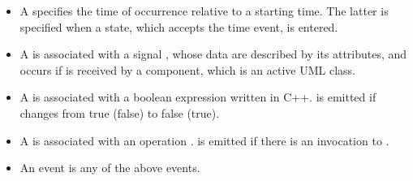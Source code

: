 	\begin{itemize}[\footnotesize]
		\item A  specifies the time of occurrence  relative to a starting time. 
		The latter is specified when a state, which accepts the time event, is entered.
		
		\item A  is associated with a signal , whose data are described by its attributes, and occurs if  is received by a component, which is an active UML class.
		
		\item A  is associated with a boolean expression  written in C++.  is emitted if  changes from true (false) to false (true).
		
		\item A  is associated with an operation . 
		 is emitted if there is an invocation to .
		
		\item An  event is any of the above events.
	\end{itemize}


